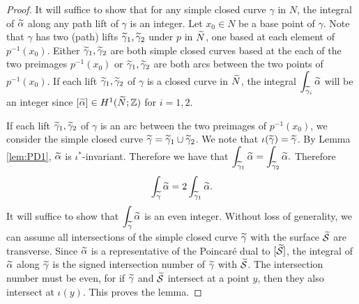 \begin{proof}
 It will suffice to show that for any simple closed curve $\gamma$ in $N$, the integral of $\widetilde{\alpha}$ along any path lift of $\gamma$ is an integer.  Let $x_0\in N$ be a base point of $\gamma$.  Note that $\gamma$ has two (path) lifts $\widetilde{\gamma}_1,\widetilde{\gamma}_2$ under $p$ in $\widetilde{N}$, one based at each element of $p^{-1}(x_0)$.  Either $\widetilde{\gamma}_1,\widetilde{\gamma}_2$ are both simple closed curves based at the each of the two preimages $p^{-1}(x_0)$ or $\widetilde{\gamma}_1,\widetilde{\gamma}_2$ are both arcs between the two points of $p^{-1}(x_0)$.
  If each lift $\widetilde{\gamma}_1,\widetilde{\gamma}_2$ of $\gamma$ is a closed curve in $\widetilde{N}$, the integral $\displaystyle\int_{\widetilde{\gamma}_i}\widetilde{\alpha}$ will be an integer since $[\widetilde{\alpha}] \in H^1(\widetilde{N}; \mathbb{Z})$ for $i=1,2$.

 If each lift $\widetilde{\gamma}_1,\widetilde{\gamma}_2$ of $\gamma$ is an arc between the two preimages of $p^{-1}(x_0)$, we consider the simple closed curve $\widetilde{\gamma}=\widetilde{\gamma}_1\cup\widetilde{\gamma}_2$.  We note that $\iota(\widetilde{\gamma})=\widetilde{\gamma}$.
  By Lemma \ref{lem:PD1}, $\widetilde{\alpha}$ is $\iota^{\ast}$-invariant.  Therefore we have that $ \displaystyle\int_{\widetilde{\gamma}_1} \widetilde{\alpha} = \displaystyle\int_{\widetilde{\gamma}_2} \widetilde{\alpha}.$  Therefore $$\int_{\widetilde{\gamma}}\widetilde{\alpha}=2\int_{\widetilde{\gamma}_1}\widetilde{\alpha}.$$ It will suffice to show that $\displaystyle\int_{\widetilde{\gamma}}\widetilde{\alpha}$ is an even integer.
  Without loss of generality, we can assume all intersections of the simple closed curve $\widetilde{\gamma}$ with the surface $\widetilde{\mathcal{S}}$ are transverse.
  Since $\widetilde{\alpha}$ is a representative of the Poincar\'e dual to $[\widetilde{\mathcal{S}}]$, the integral of $\widetilde{\alpha}$ along $\widetilde{\gamma}$ is the signed intersection number of $\widetilde{\gamma}$ with $\widetilde{\mathcal{S}}$.
  The intersection number must be even, for if $\widetilde{\gamma}$ and $\widetilde{\mathcal{S}}$ intersect at a point $y$, then they also intersect at $\iota(y)$. This proves the lemma.
\end{proof}

